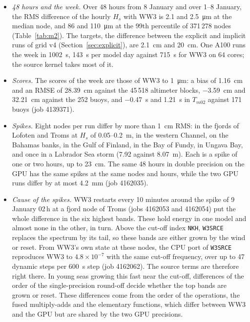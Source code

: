 \documentclass[11pt,a4paper]{article}
\begin{document}
\begin{itemize}
propagation of each step, with the wind interpolated as \texttt{W3UWND}
does and taken relative to the current. After the first three steps from
the restart of 8 January, $H_s$ agrees with the WW3 restarts within
\SI{1}{mm} at all but 13 of 371\,000 nodes, \SI{7.9}{mm} at most (job
4138987). The remaining differences sit in the high-frequency bands of a
few nodes.
\item \emph{48 hours and the week.} Over 48 hours from 8 January and over
1--8 January, the RMS difference of the hourly $H_s$ with WW3 is
2.1 and \SI{2.5}{\micro\metre} at the median node, and 86 and
\SI{110}{\micro\metre} at the 99th percentile of 371\,278 nodes
(Table~\ref{tab:m2}). The targets, the difference between the explicit and
implicit runs of grid v4 (Section~\ref{sec:explicit}), are \SI{2.1}{cm}
and \SI{20}{cm}. One A100 runs the week in \SI{1002}{s},
\SI{143}{s} per model day against \SI{715}{s} for WW3 on 64 cores; the
source kernel takes most of it.
\item \emph{Scores.} The scores of the week are those of WW3 to
\SI{1}{\micro\metre}: a bias of \SI{+1.16}{cm} and an RMSE of
\SI{28.39}{cm} against the 45\,518 altimeter blocks, \SI{-3.59}{cm} and
\SI{32.21}{cm} against the 252 buoys, and \SI{-0.47}{s} and \SI{1.21}{s}
in $T_{m02}$ against 171 buoys (job 4139371).
\item \emph{Spikes.} Eight nodes per run differ by more than \SI{1}{cm}
RMS: in the fjords of Lofoten and Troms at $H_s$ of 0.05--\SI{0.2}{m}, in
the western Channel, on the Bahamas banks, in the Gulf of Finland, in the
Bay of Fundy, in Ungava Bay, and once in a Labrador Sea storm (7.92
against \SI{8.07}{m}). Each is a spike of one or two hours, up to
\SI{23}{cm}. The same 48 hours in double precision on the GPU has the same
spikes at the same nodes and hours, while the two GPU runs differ by at
most \SI{4.2}{mm} (job 4162035).
\item \emph{Cause of the spikes.} WW3 restarts every 10 minutes around the
spike of 9 January 02\,h at a fjord node of Troms (jobs 4162053 and
4162054) put the whole difference in the six highest bands. These hold
energy in one model and almost none in the other, in turn. Above the
cut-off index \texttt{NKH}, \texttt{W3SRCE} replaces the spectrum by its
tail, so these bands are either grown by the wind or reset. From WW3's own
state at these nodes, the CPU port of \texttt{W3SRCE} reproduces WW3 to
$4.8\times10^{-7}$ with the same cut-off frequency, over up to 47 dynamic
steps per \SI{600}{s} step (job 4162062). The source terms are therefore
right there. In young seas growing this fast near the cut-off, differences
of the order of the single-precision round-off decide whether the top
bands are grown or reset. These differences come from the order of the
operations, the fused multiply-adds and the elementary functions, which
differ between WW3 and the GPU but are shared by the two GPU precisions.
\end{itemize}
\end{document}
